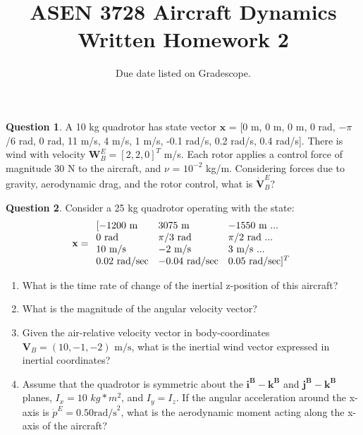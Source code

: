 \documentclass{article}
\title{ASEN 3728 Aircraft Dynamics\\Written Homework 2}
\date{Due date listed on Gradescope.}
\theoremstyle{definition}
\newtheorem{question}{Question}
\begin{document}

\maketitle

\begin{question}
    A 10 kg quadrotor has state vector $\mathbf{x}$ = [0 m, 0 m, 0 m, 0 rad, $-\pi$/6 rad, 0 rad, 11 m/s, 4 m/s, 1 m/s, -0.1 rad/s, 0.2 rad/s, 0.4 rad/s]. There is wind with velocity $\mathbf{W}_B^E = [2,2,0]^T$ m/s. Each rotor applies a control force of magnitude 30 N to the aircraft, and $\nu$ = $10^{-2}$ kg/m. Considering forces due to gravity, aerodynamic drag, and the rotor control, what is $\dot{\mathbf{V}}_B^E$?
\end{question}
\vspace{0.1cm}


\clearpage

\begin{question}

Consider a 25 kg quadrotor operating with the state:
\begin{equation}
\nonumber
{\bf x} = 
\begin{array}{lll}
[-1200 \textrm{ m} & 3075 \textrm{ m} & -1550 \textrm{ m } ... \\
0 \textrm{ rad} & \pi/3 \textrm{ rad} & \pi/2 \textrm{ rad } ... \\
10 \textrm{ m/s} & -2 \textrm{ m/s} & 3 \textrm{ m/s } ... \\
0.02 \textrm{ rad/sec} & -0.04 \textrm{ rad/sec} & 0.05 \textrm{ rad/sec}]^T
\end{array}
\end{equation}

\begin{enumerate}[label=(\Alph*)]

\item What is the time rate of change of the inertial z-position of this aircraft?
\item What is the magnitude of the angular velocity vector?

\item Given the air-relative velocity vector in body-coordinates $\mathbf{V}_B = (10, -1, -2) \textrm{ m/s}$, what is the inertial wind vector expressed in inertial coordinates?

\item Assume that the quadrotor is symmetric about the $\mathbf{i^B-k^B}$ and $\mathbf{j^B-k^B}$ planes, $I_x = 10$ $kg* m^2$, and $I_y = I_z$. If the angular acceleration around the x-axis is $\dot{p}^E = 0.50 \textrm{rad/s}^2$, what is the aerodynamic moment acting along the x-axis of the aircraft? 

\end{enumerate}

\end{question}
\end{document}
